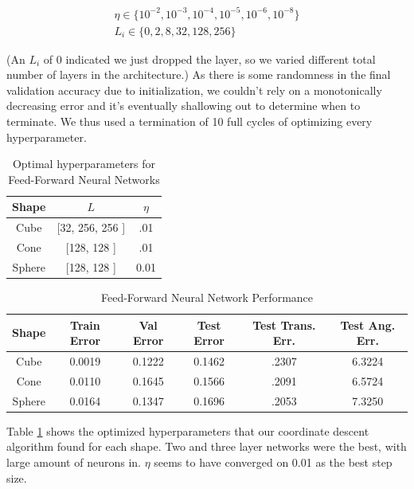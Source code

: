 \documentclass[journal]{IEEEtran}
\begin{document}
\begin{gather}
\eta \in \{  10^{-2}, 10^{-3}, 10^{-4}, 10^{-5}, 10^{-6}, 10^{-8} \}\\
L_i \in \{  0, 2, 8, 32, 128, 256  \}
\end{gather}

\noindent (An $L_i$ of 0 indicated we just dropped the layer, so we varied different total number of layers in the architecture.) As there is some randomness in the final validation accuracy due to initialization, we couldn't rely on a monotonically decreasing error and it's eventually shallowing out to determine when to terminate. We thus used a termination of 10 full cycles of optimizing every hyperparameter.

\begin{table}
\caption{Optimal hyperparameters for Feed-Forward Neural Networks}
\label{FFNN_Params}
\centering

\begin{tabular}{|c|c|c|}
\hline
Shape & $L$ & $\eta$\\
\hline
Cube & [32, 256, 256 ] & .01\\
Cone & [128, 128 ] & .01\\
Sphere & [128, 128 ] & 0.01\\
\hline
\end{tabular}

\end{table}

\begin{table}

\caption{Feed-Forward Neural Network Performance}
\label{FFNN_Perf}

\hspace*{-10 ex}
\begin{tabular}{|c|c|c|c|c|c|}
\hline
Shape & Train Error & Val Error & Test Error & Test Trans. Err. & Test Ang. Err.\\
\hline
Cube &0.0019    &0.1222   & 0.1462 & .2307 &  6.3224\\
Cone &0.0110   &0.1645    &0.1566 & .2091 & 6.5724\\
Sphere &0.0164    &0.1347   & 0.1696 & .2053 & 7.3250\\
\hline
\end{tabular}

\end{table}

Table \ref{FFNN_Params} shows the optimized hyperparameters that our coordinate descent algorithm found for each shape. Two and three layer networks were the best, with large amount of neurons in. $\eta$ seems to have converged on 0.01 as the best step size.
\end{document}
